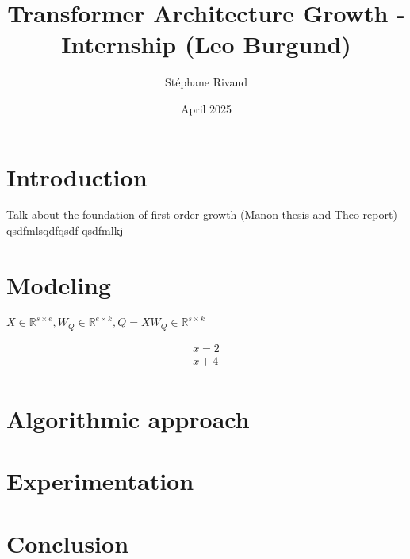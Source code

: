 \documentclass{article}
\title{Transformer Architecture Growth - Internship (Leo Burgund)}
\author{Stéphane Rivaud}
\date{April 2025}
\begin{document}
\maketitle

\section{Introduction}
Talk about the foundation of first order growth (Manon thesis and Theo report) qsdfmlsqdfqsdf
qsdfmlkj

\section{Modeling}
$X \in \mathbb{R}^{s \times e}, W_Q \in \mathbb{R}^{e\times k} , Q=XW_Q \in \mathbb{R}^{s \times  k}$

$$
\begin{aligned}
  x=2\\
  x+4\\
\end{aligned}
$$

\section{Algorithmic approach}

\section{Experimentation}

\section{Conclusion}
\end{document}
